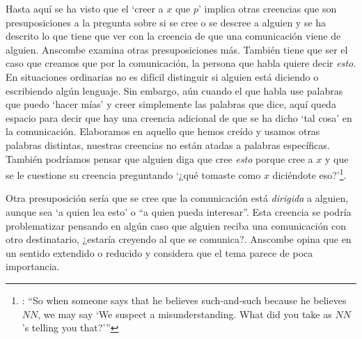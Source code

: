 Hasta aquí se ha visto que el `creer a $x$ que $p$' implica otras creencias que son presuposiciones a la pregunta sobre si se cree o se descree a alguien y se ha descrito lo que tiene que ver con la creencia de que una comunicación viene de alguien. Anscombe examina otras presuposiciones más. También tiene que ser el caso que creamos que por la comunicación, la persona que habla quiere decir \emph{esto}. En situaciones ordinarias no es difícil distinguir si alguien está diciendo o escribiendo algún lenguaje. Sin embargo, aún cuando el que habla use palabras que puedo `hacer mías' y creer simplemente las palabras que dice, aquí queda espacio para decir que hay una creencia adicional de que se ha dicho `tal cosa' en la comunicación. Elaboramos en aquello que hemos creído y usamos otras palabras distintas, nuestras creencias no están atadas a palabras específicas. También podríamos pensar que alguien diga que cree \emph{esto} porque cree a $x$ y que se le cuestione su creencia preguntando \enquote*{¿qué tomaste como $x$ diciéndote eso?}\footnote{\cite[Cf.~][8]{anscombe2008faith:tobelieve}: \enquote{So when someone says that he believes such-and-such because he believes $NN$, we may say `We suspect a misunderstanding. What did you take as $NN$'s telling you that?'}}.

Otra presuposición sería que se cree que la comunicación está \emph{dirigida} a alguien, aunque sea \enquote*{a quien lea esto} o \enquote{a quien pueda interesar}. Esta creencia se podría problematizar pensando en algún caso que alguien reciba una comunicación con otro destinatario, ¿estaría creyendo al que se comunica?. Anscombe opina que en un sentido extendido o reducido y considera que el tema parece de poca importancia.

